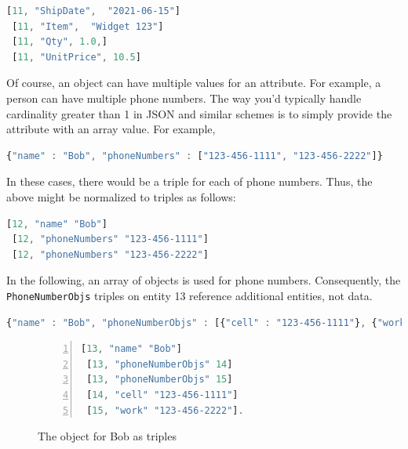 \documentclass[9pt,letterpaper]{article}
\newcommand{\stt}[1]{\texttt{#1}}
\begin{document}
\begin{lstlisting}[language=JavaScript,basicstyle=\ttfamily\scriptsize]
 [11, "ShipDate",  "2021-06-15"]
 [11, "Item",  "Widget 123"]
 [11, "Qty", 1.0,]
 [11, "UnitPrice", 10.5]
\end{lstlisting}

Of course, an object can have multiple values for an attribute.
For example, a person can have multiple phone numbers.
The way you'd typically handle cardinality greater than 1 in JSON and similar schemes is to simply provide the attribute with an array value.
For example,

\begin{lstlisting}[language=JavaScript,basicstyle=\ttfamily\scriptsize]
 {"name" : "Bob", "phoneNumbers" : ["123-456-1111", "123-456-2222"]}
\end{lstlisting}

In these cases, there would be a triple for each of phone numbers.
Thus, the above might be normalized to triples as follows:

\begin{lstlisting}[language=JavaScript,basicstyle=\ttfamily\scriptsize]
 [12, "name" "Bob"]
 [12, "phoneNumbers" "123-456-1111"]
 [12, "phoneNumbers" "123-456-2222"]
\end{lstlisting}

In the following, an array of objects is used for phone numbers.
Consequently, the \stt{PhoneNumberObjs} triples on entity 13 reference additional entities, not data.

\begin{lstlisting}[language=JavaScript,basicstyle=\ttfamily\scriptsize]
{"name" : "Bob", "phoneNumberObjs" : [{"cell" : "123-456-1111"}, {"work" : "123-456-2222"}]}
\end{lstlisting}

\begin{figure}[H]
  \caption{The object for Bob as triples}
  \label{code:bob-phone}
\begin{lstlisting}[language=JavaScript,numberstyle=\scriptsize,basicstyle=\ttfamily\scriptsize,numbers=left,stepnumber=1,breaklines=true]
 [13, "name" "Bob"]
 [13, "phoneNumberObjs" 14]
 [13, "phoneNumberObjs" 15]
 [14, "cell" "123-456-1111"]
 [15, "work" "123-456-2222"].
\end{lstlisting}
\end{figure}
\end{document}
